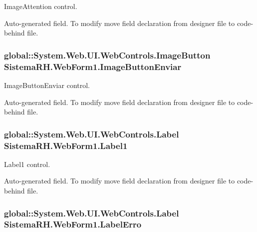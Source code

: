 ImageAttention control. 

Auto-\/generated field. To modify move field declaration from designer file to code-\/behind file. \hypertarget{class_sistema_r_h_1_1_web_form1_a00770412a46682d47cf488aa32da22d2}{
\subsubsection[{ImageButtonEnviar}]{\setlength{\rightskip}{0pt plus 5cm}global::System.Web.UI.WebControls.ImageButton {\bf SistemaRH.WebForm1.ImageButtonEnviar}}}
\label{class_sistema_r_h_1_1_web_form1_a00770412a46682d47cf488aa32da22d2}


ImageButtonEnviar control. 

Auto-\/generated field. To modify move field declaration from designer file to code-\/behind file. \hypertarget{class_sistema_r_h_1_1_web_form1_add2edc3a2b9b5b6be19e4b3af2458211}{
\subsubsection[{Label1}]{\setlength{\rightskip}{0pt plus 5cm}global::System.Web.UI.WebControls.Label {\bf SistemaRH.WebForm1.Label1}}}
\label{class_sistema_r_h_1_1_web_form1_add2edc3a2b9b5b6be19e4b3af2458211}


Label1 control. 

Auto-\/generated field. To modify move field declaration from designer file to code-\/behind file. \hypertarget{class_sistema_r_h_1_1_web_form1_a1e886dd55344d877d73ac0022d7b5f44}{
\subsubsection[{LabelErro}]{\setlength{\rightskip}{0pt plus 5cm}global::System.Web.UI.WebControls.Label {\bf SistemaRH.WebForm1.LabelErro}}}
\label{class_sistema_r_h_1_1_web_form1_a1e886dd55344d877d73ac0022d7b5f44}


